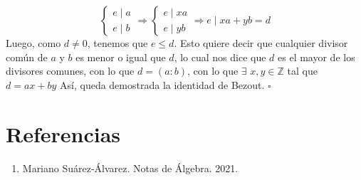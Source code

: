\documentclass[]{article}
\begin{document}
$$
\begin{cases}
	e \mid a \\
	e \mid b
\end{cases}
\Rightarrow
\begin{cases}
	e \mid xa \\
	e \mid yb
\end{cases}
\Rightarrow
e \mid xa+yb=d
$$
Luego, como $d \neq 0$, tenemos que $e \leq d$. Esto quiere decir que cualquier divisor común de $a$ y $b$ es menor o igual que $d$, lo cual nos dice que $d$ es el mayor de los divisores comunes, con lo que $d=(a:b)$, con lo que $\exists$ $x, y \in \mathbb{Z}$ tal que $d=ax + by$  Así, queda demostrada la identidad de Bezout. $\square$

\section{Referencias}
\begin{enumerate}
	\item Mariano Suárez-Álvarez. Notas de Álgebra. 2021.
\end{enumerate}
\end{document}
